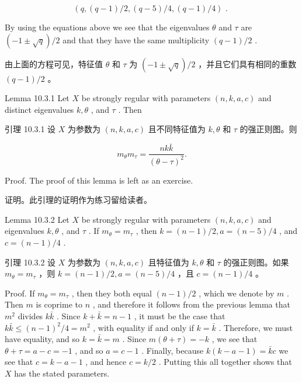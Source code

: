 \documentclass[10pt]{article}
\begin{document}
\[
\left( {q,\left( {q - 1}\right) /2,\left( {q - 5}\right) /4,\left( {q - 1}\right) /4}\right) \text{ . }
\]

By using the equations above we see that the eigenvalues \(\theta\) and \(\tau\) are \(\left( {-1 \pm  \sqrt{q}}\right) /2\) and that they have the same multiplicity \(\left( {q - 1}\right) /2\) .

\begin{tcolorbox}\relax
由上面的方程可见，特征值 \(\theta\) 和 \(\tau\) 为 \(\left( {-1 \pm  \sqrt{q}}\right) /2\) ，并且它们具有相同的重数 \(\left( {q - 1}\right) /2\) 。
\end{tcolorbox}

Lemma 10.3.1 Let \(X\) be strongly regular with parameters \(\left( {n,k,a,c}\right)\) and distinct eigenvalues \(k,\theta\) , and \(\tau\) . Then

\begin{tcolorbox}\relax
引理 10.3.1 设 \(X\) 为参数为 \(\left( {n,k,a,c}\right)\) 且不同特征值为 \(k,\theta\) 和 \(\tau\) 的强正则图。则
\end{tcolorbox}

\[
{m}_{\theta }{m}_{\tau } = \frac{{nk}\bar{k}}{{\left( \theta  - \tau \right) }^{2}}.
\]

Proof. The proof of this lemma is left as an exercise.

\begin{tcolorbox}\relax
证明。此引理的证明作为练习留给读者。
\end{tcolorbox}

Lemma 10.3.2 Let \(X\) be strongly regular with parameters \(\left( {n,k,a,c}\right)\) and eigenvalues \(k,\theta\) , and \(\tau\) . If \({m}_{\theta } = {m}_{\tau }\) , then \(k = \left( {n - 1}\right) /2,a = \left( {n - 5}\right) /4\) , and \(c = \left( {n - 1}\right) /4\) .

\begin{tcolorbox}\relax
引理 10.3.2 设 \(X\) 为参数为 \(\left( {n,k,a,c}\right)\) 且特征值为 \(k,\theta\) 和 \(\tau\) 的强正则图。如果 \({m}_{\theta } = {m}_{\tau }\) ，则 \(k = \left( {n - 1}\right) /2,a = \left( {n - 5}\right) /4\) ，且 \(c = \left( {n - 1}\right) /4\) 。
\end{tcolorbox}

Proof. If \({m}_{\theta } = {m}_{\tau }\) , then they both equal \(\left( {n - 1}\right) /2\) , which we denote by \(m\) . Then \(m\) is coprime to \(n\) , and therefore it follows from the previous lemma that \({m}^{2}\) divides \(k\bar{k}\) . Since \(k + \bar{k} = n - 1\) , it must be the case that \(k\bar{k} \leq  {\left( n - 1\right) }^{2}/4 = {m}^{2}\) , with equality if and only if \(k = \bar{k}\) . Therefore, we must have equality, and so \(k = \bar{k} = m\) . Since \(m\left( {\theta  + \tau }\right)  =  - k\) , we see that \(\theta  + \tau  = a - c =  - 1\) , and so \(a = c - 1\) . Finally, because \(k\left( {k - a - 1}\right)  = \bar{k}c\) we see that \(c = k - a - 1\) , and hence \(c = k/2\) . Putting this all together shows that \(X\) has the stated parameters.
\end{document}

